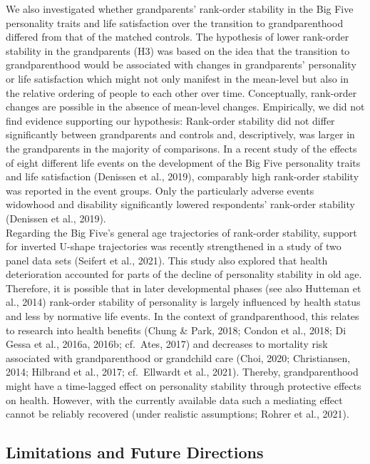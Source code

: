 \documentclass[
  english,
  man, noextraspace]{apa7}
\begin{document}
We also investigated whether grandparents' rank-order stability in the Big Five personality traits and life satisfaction over the transition to grandparenthood differed from that of the matched controls. The hypothesis of lower rank-order stability in the grandparents (H3) was based on the idea that the transition to grandparenthood would be associated with changes in grandparents' personality or life satisfaction which might not only manifest in the mean-level but also in the relative ordering of people to each other over time. Conceptually, rank-order changes are possible in the absence of mean-level changes. Empirically, we did not find evidence supporting our hypothesis: Rank-order stability did not differ significantly between grandparents and controls and, descriptively, was larger in the grandparents in the majority of comparisons. In a recent study of the effects of eight different life events on the development of the Big Five personality traits and life satisfaction (Denissen et al., 2019), comparably high rank-order stability was reported in the event groups. Only the particularly adverse events widowhood and disability significantly lowered respondents' rank-order stability (Denissen et al., 2019).\\
Regarding the Big Five's general age trajectories of rank-order stability, support for inverted U-shape trajectories was recently strengthened in a study of two panel data sets (Seifert et al., 2021). This study also explored that health deterioration accounted for parts of the decline of personality stability in old age. Therefore, it is possible that in later developmental phases (see also Hutteman et al., 2014) rank-order stability of personality is largely influenced by health status and less by normative life events. In the context of grandparenthood, this relates to research into health benefits (Chung \& Park, 2018; Condon et al., 2018; Di Gessa et al., 2016a, 2016b; cf.~Ates, 2017) and decreases to mortality risk associated with grandparenthood or grandchild care (Choi, 2020; Christiansen, 2014; Hilbrand et al., 2017; cf.~Ellwardt et al., 2021). Thereby, grandparenthood might have a time-lagged effect on personality stability through protective effects on health. However, with the currently available data such a mediating effect cannot be reliably recovered (under realistic assumptions; Rohrer et al., 2021).

\hypertarget{limitations-and-future-directions}{%
\subsection{Limitations and Future Directions}\label{limitations-and-future-directions}}
\end{document}
